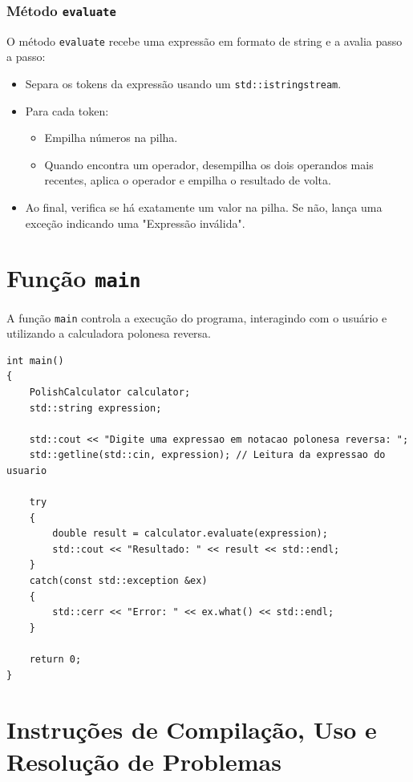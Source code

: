 \documentclass[a4paper,12pt]{article}
\begin{document}
\subsubsection{Método \texttt{evaluate}}
O método \texttt{evaluate} recebe uma expressão em formato de string e a avalia passo a passo:
\begin{itemize}
    \item Separa os tokens da expressão usando um \texttt{std::istringstream}.
    \item Para cada token:
      \begin{itemize}
        \item Empilha números na pilha.
        \item Quando encontra um operador, desempilha os dois operandos mais recentes, aplica o operador e empilha o resultado de volta.
      \end{itemize}
    \item Ao final, verifica se há exatamente um valor na pilha. Se não, lança uma exceção indicando uma "Expressão inválida".
\end{itemize}
\newpage
\section{Função \texttt{main}}
A função \texttt{main} controla a execução do programa, interagindo com o usuário e utilizando a calculadora polonesa reversa.

\begin{lstlisting}[caption={Implementação da função principal \texttt{Main}}, label={lst:main}]
int main()
{
    PolishCalculator calculator;
    std::string expression;

    std::cout << "Digite uma expressao em notacao polonesa reversa: ";
    std::getline(std::cin, expression); // Leitura da expressao do usuario

    try
    {
        double result = calculator.evaluate(expression);
        std::cout << "Resultado: " << result << std::endl;
    }
    catch(const std::exception &ex)
    {
        std::cerr << "Error: " << ex.what() << std::endl;
    }

    return 0;
}
\end{lstlisting}

\section{Instruções de Compilação, Uso e Resolução de Problemas}
\end{document}
